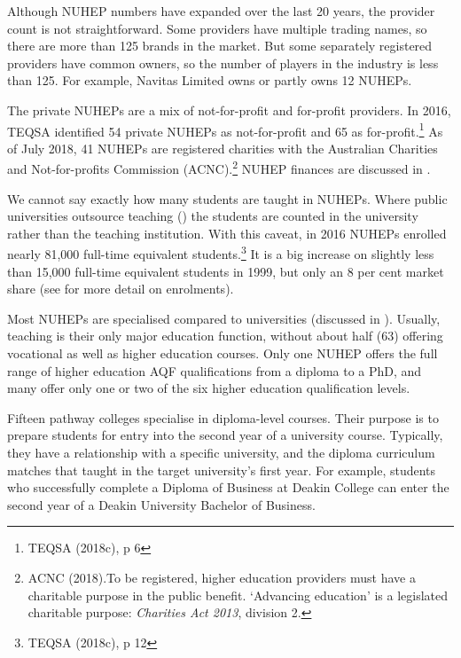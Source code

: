 \documentclass{grattan}
\begin{document}
Although NUHEP numbers have expanded over the last 20 years, the provider count is not straightforward. Some providers have multiple trading names, so there are more than 125 brands in the market. But some separately registered providers have common owners, so the number of players in the industry is less than 125. For example, Navitas Limited owns or partly owns 12 NUHEPs.

The private NUHEPs are a mix of not-for-profit and for-profit providers. In 2016, TEQSA identified 54 private NUHEPs as not-for-profit and 65 as for-profit.\footnote{TEQSA (2018c), p 6} As of July 2018, 41 NUHEPs are registered charities with the Australian Charities and Not-for-profits Commission (ACNC).\footnote{ACNC (2018).To be registered, higher education providers must have a charitable purpose in the public benefit. `Advancing education' is a legislated charitable purpose: \emph{Charities Act 2013}, division 2.} NUHEP finances are discussed in .

We cannot say exactly how many students are taught in NUHEPs. Where public universities outsource teaching () the students are counted in the university rather than the teaching institution. With this caveat, in 2016 NUHEPs enrolled nearly 81,000 full-time equivalent students.\footnote{TEQSA (2018c), p 12} It is a big increase on slightly less than 15,000 full-time equivalent students in 1999, but only an 8 per cent market share (see  for more detail on enrolments).

Most NUHEPs are specialised compared to universities (discussed in ). Usually, teaching is their only major education function, without about half (63) offering vocational as well as higher education courses. Only one NUHEP offers the full range of higher education AQF qualifications from a diploma to a PhD, and many offer only one or two of the six higher education qualification levels.

Fifteen pathway colleges specialise in diploma-level courses. Their purpose is to prepare students for entry into the second year of a university course. Typically, they have a relationship with a specific university, and the diploma curriculum matches that taught in the target university's first year. For example, students who successfully complete a Diploma of Business at Deakin College can enter the second year of a Deakin University Bachelor of Business.
\end{document}
